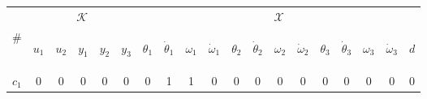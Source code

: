 \documentclass[a4,11pt]{article}
\begin{document}
\begin{table}[!htb]
\centering
\normalsize
\begin{tabular}{|l|ccccc|ccccccccccccc|}
\hline
&\multicolumn{5}{c|}{$\mathcal{K}$} & \multicolumn{13}{|c|}{$\mathcal{X}$}\\
\cline{2-19}
\# & \begin{sideways}$u_1$\end{sideways}& \begin{sideways}$u_2$\end{sideways}& \begin{sideways}$y_1$\end{sideways}& \begin{sideways}$y_2$\end{sideways}& \begin{sideways}$y_3$\end{sideways}& \begin{sideways}$\theta_1$\end{sideways}& \begin{sideways}$\dot{\theta}_1$\end{sideways}& \begin{sideways}$\omega_1$\end{sideways}& \begin{sideways}$\dot{\omega}_1$\end{sideways}& \begin{sideways}$\theta_2$\end{sideways}& \begin{sideways}$\dot{\theta}_2$\end{sideways}& \begin{sideways}$\omega_2$\end{sideways}& \begin{sideways}$\dot{\omega}_2$\end{sideways}& \begin{sideways}$\theta_3$\end{sideways}& \begin{sideways}$\dot{\theta}_3$\end{sideways}& \begin{sideways}$\omega_3$\end{sideways}& \begin{sideways}$\dot{\omega}_3$\end{sideways}& \begin{sideways}$d$\end{sideways} \\ 
\hline
$c_1$  & 0 & 0 & 0 & 0 & 0 & 0 & 1 & 1 & 0 & 0 & 0 & 0 & 0 & 0 & 0 & 0 & 0 & 0 \\ 

\end{tabular}
\end{table}
\end{document}
